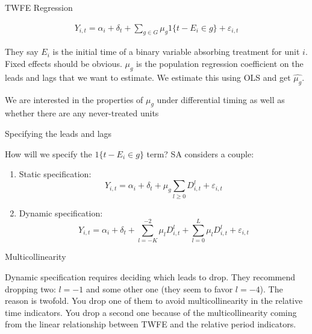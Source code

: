 \documentclass{beamer}
\begin{document}
\begin{frame}{TWFE Regression}

\begin{eqnarray*}
Y_{i,t} = \alpha_i + \delta_t + \sum_{g \in G} \mu_g1\{t-E_i \in g \} + \varepsilon_{i,t}
\end{eqnarray*}


\bigskip

They say $E_i$ is the initial time of a binary variable absorbing treatment for unit $i$. Fixed effects should be obvious.  $\mu_g$ is the population regression coefficient on the leads and lags that we want to estimate. We estimate this using OLS and get $\widehat{\mu_g}$. 

\bigskip

We are interested in the properties of $\mu_g$ under differential timing as well as whether there are any never-treated units

\end{frame}


\begin{frame}{Specifying the leads and lags}

How will we specify the $1\{t-E_i \in g \} $ term?  SA considers a couple:

\begin{enumerate}
\item Static specification: $$Y_{i,t} = \alpha_i + \delta_t + \mu_g \sum_{l \geq 0}D^l_{i,t} + \varepsilon_{i,t}$$
\item Dynamic specification: $$Y_{i,t} = \alpha_i + \delta_t + \sum_{l = -K}^{-2} \mu_l D^l_{i,t} + \sum_{l=0}^L\mu_lD^l_{i,t}+ \varepsilon_{i,t}$$
\end{enumerate}


\end{frame}


\begin{frame}{Multicollinearity}

Dynamic specification requires deciding which leads to drop.  They recommend dropping two: $l=-1$ and some other one (they seem to favor $l=-4$).  The reason is twofold. You drop one of them to avoid multicollinearity in the relative time indicators. You drop a second one because of the multicollinearity coming from the linear relationship between TWFE and the relative period indicators.

\end{frame}
\end{document}
